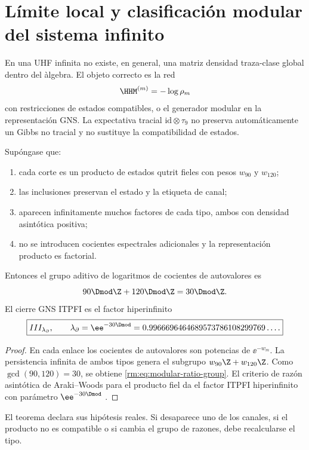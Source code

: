 \section{L\'imite local y clasificaci\'on modular del sistema infinito}

En una UHF infinita no existe, en general, una matriz densidad traza-clase
global dentro del \`algebra. El objeto correcto es la red
\begin{equation}
\label{rm:eq:modular-local-net}
\HHM^{(m)}=-\log\rho_m
\end{equation}
con restricciones de estados compatibles, o el generador modular en la
representaci\'on GNS. La expectativa tracial
\(\mathrm{id}\otimes\tau_9\) no preserva autom\'aticamente un Gibbs no
tracial y no sustituye la compatibilidad de estados.

\begin{theorem}
\label{rm:thm:modular-typeIII}
Sup\'ongase que:
\begin{enumerate}[label=(\roman*)]
\item cada corte es un producto de estados qutrit fieles con pesos
\(w_{90}\) y \(w_{120}\);
\item las inclusiones preservan el estado y la etiqueta de canal;
\item aparecen infinitamente muchos factores de cada tipo, ambos con
densidad asint\'otica positiva;
\item no se introducen cocientes espectrales adicionales y la
representaci\'on producto es factorial.
\end{enumerate}
Entonces el grupo aditivo de logaritmos de cocientes de autovalores es
\begin{equation}
\label{rm:eq:modular-ratio-group}
90\Dmod\Z+120\Dmod\Z=30\Dmod\Z.
\end{equation}
El cierre GNS ITPFI es el factor hiperinfinito
\begin{equation}
\label{rm:eq:modular-typeIII-lambda}
\boxed{
III_{\lambda_\partial},
\qquad
\lambda_\partial=\ee^{-30\Dmod}
=0.9966696464689573786108299769\ldots .}
\end{equation}
\end{theorem}

\begin{proof}
En cada enlace los cocientes de autovalores son potencias de
\(\ee^{-w_m}\). La persistencia infinita de ambos tipos genera el subgrupo
\(w_{90}\Z+w_{120}\Z\). Como \(\gcd(90,120)=30\), se obtiene
\cref{rm:eq:modular-ratio-group}. El criterio de raz\'on asint\'otica de
Araki--Woods para el producto fiel da el factor ITPFI hiperinfinito con
par\'ametro \(\ee^{-30\Dmod}\)
\cite{rm:ArakiWoods1968,rm:Takesaki}.
\end{proof}

El teorema declara sus hip\'otesis reales. Si desaparece uno de los canales,
si el producto no es compatible o si cambia el grupo de razones, debe
recalcularse el tipo.
